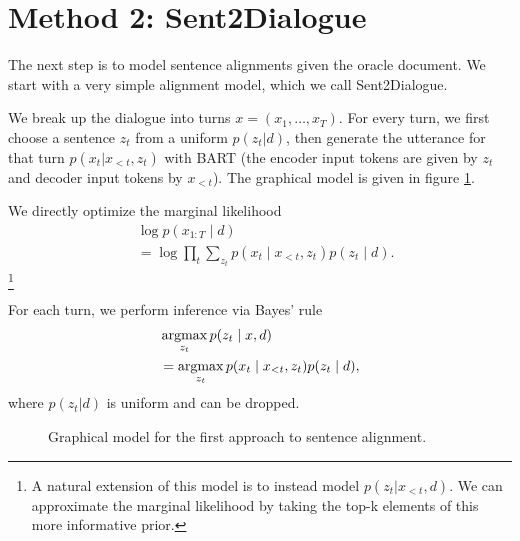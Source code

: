 \documentclass[11pt]{article}
\begin{document}
\section{Method 2: Sent2Dialogue}
The next step is to model sentence alignments given the oracle document.
We start with a very simple alignment model, which we call Sent2Dialogue.

We break up the dialogue into turns $x = (x_1,\ldots,x_T)$.
For every turn, we first choose a sentence $z_t$ from a uniform $p(z_t|d)$,
then generate the utterance for that turn $p(x_t|x_{<t}, z_t)$ with BART
(the encoder input tokens are given by $z_t$ and decoder input tokens by $x_{<t}$).
The graphical model is given in figure \ref{fig:pgm-sent1}.

We directly optimize the marginal likelihood
\begin{equation}
\begin{aligned}
&\log p(x_{1:T}\mid d)\\
&= \log \prod_t \sum_{z_t} p(x_t \mid x_{<t}, z_t) p(z_t\mid d).
\end{aligned}
\end{equation}
\footnote{A natural extension of this model is to instead model $p(z_t|x_{<t},d)$.
We can approximate the marginal likelihood by taking the top-k elements of this
more informative prior.}

For each turn, we perform inference via Bayes' rule
\begin{equation}
\begin{aligned}
&\operatorname*{argmax}_{z_t} p(z_t \mid x, d)\\
&= \operatorname*{argmax}_{z_t} p(x_t \mid x_{<t}, z_t)p(z_t\mid d),
\end{aligned}
\end{equation}
where $p(z_t|d)$ is uniform and can be dropped.

\begin{figure}[t]
\begin{center}
\end{center}
\caption{Graphical model for the first approach to sentence alignment.
}
\label{fig:pgm-sent1}
\end{figure}
\end{document}
